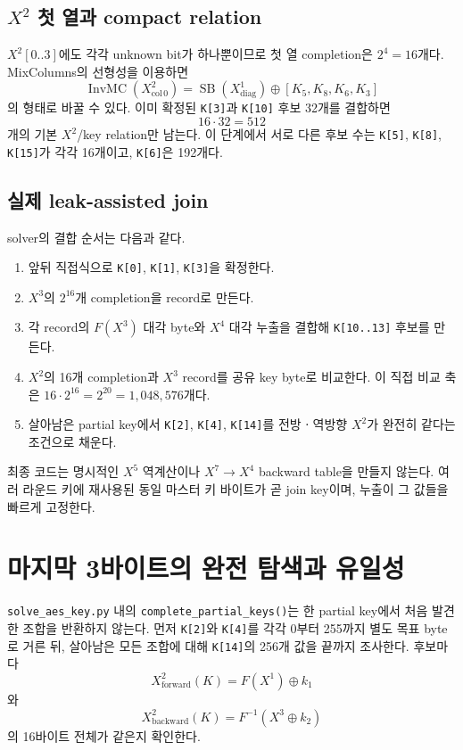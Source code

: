 \documentclass[10pt,a4paper]{article}
\begin{document}
\subsection{\texorpdfstring{$X^2$}{X2} 첫 열과 compact relation}

$X^2[0..3]$에도 각각 unknown bit가 하나뿐이므로 첫 열 completion은
$2^4=16$개다. MixColumns의 선형성을 이용하면
\[
\operatorname{InvMC}(X^2_{\mathrm{col}\,0})
=\operatorname{SB}(X^1_{\mathrm{diag}})
 \oplus [K_5,K_8,K_6,K_3]
\]
의 형태로 바꿀 수 있다. 이미 확정된 \texttt{K[3]}과
\texttt{K[10]} 후보 32개를 결합하면
\[
 16\mathbin{\cdot}32=512
\]
개의 기본 $X^2$/key relation만 남는다. 이 단계에서 서로 다른 후보
수는 \texttt{K[5]}, \texttt{K[8]}, \texttt{K[15]}가 각각 16개이고,
\texttt{K[6]}은 192개다.

\subsection{실제 leak-assisted join}

solver의 결합 순서는 다음과 같다.

\begin{enumerate}
  \item 앞뒤 직접식으로 \texttt{K[0]}, \texttt{K[1]},
        \texttt{K[3]}을 확정한다.
  \item $X^3$의 $2^{16}$개 completion을 record로 만든다.
  \item 각 record의 $F(X^3)$ 대각 byte와 $X^4$ 대각 누출을 결합해
        \texttt{K[10..13]} 후보를 만든다.
  \item $X^2$의 16개 completion과 $X^3$ record를 공유 key byte로
        비교한다. 이 직접 비교 축은
        $16\mathbin{\cdot}2^{16}=2^{20}=1{,}048{,}576$개다.
  \item 살아남은 partial key에서 \texttt{K[2]}, \texttt{K[4]},
        \texttt{K[14]}를 전방ㆍ역방향 $X^2$가 완전히 같다는 조건으로
        채운다.
\end{enumerate}

최종 코드는 명시적인 $X^5$ 역계산이나 $X^7\rightarrow X^4$ backward
table을 만들지 않는다. 여러 라운드 키에 재사용된 동일 마스터 키
바이트가 곧 join key이며, 누출이 그 값들을 빠르게 고정한다.

\section{마지막 3바이트의 완전 탐색과 유일성}

\texttt{solve\_aes\_key.py} 내의 \texttt{complete\_partial\_keys()}는
한 partial key에서 처음 발견한
조합을 반환하지 않는다. 먼저 \texttt{K[2]}와 \texttt{K[4]}를 각각
0부터 255까지 별도 목표 byte로 거른 뒤, 살아남은 모든 조합에 대해
\texttt{K[14]}의 256개 값을 끝까지 조사한다. 후보마다
\[
 X^2_{\mathrm{forward}}(K)
 =F(X^1)\oplus k_1
\]
와
\[
 X^2_{\mathrm{backward}}(K)
 =F^{-1}(X^3\oplus k_2)
\]
의 16바이트 전체가 같은지 확인한다.
\end{document}
